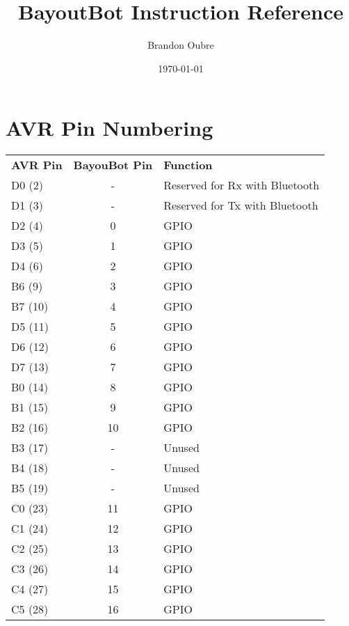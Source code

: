 \documentclass[letterpaper,titlepage]{article}
\begin{document}
	\title{BayoutBot Instruction Reference}
	\author{Brandon Oubre}
	\date{\today}
	\maketitle
	
	\newcommand{\instrDesc}[2]{
		\textbf{#1} \\
		#2 \\
	}

	\section*{AVR Pin Numbering}
	\begin{tabular}{l | c | l}
	\textbf{AVR Pin} & \textbf{BayouBot Pin} & \textbf{Function} \\
	D0 (2) & - & Reserved for Rx with Bluetooth \\
	D1 (3) & - & Reserved for Tx with Bluetooth \\
	D2 (4) & 0 & GPIO \\
	D3 (5) & 1 & GPIO \\
	D4 (6) & 2 & GPIO \\
	B6 (9) & 3 & GPIO \\
	B7 (10) & 4 & GPIO \\
	D5 (11) & 5 & GPIO \\
	D6 (12) & 6 & GPIO \\
	D7 (13) & 7 & GPIO \\
	B0 (14) & 8 & GPIO \\
	B1 (15) & 9 & GPIO \\
	B2 (16) & 10 & GPIO \\
	B3 (17) & - & Unused \\
	B4 (18) & - & Unused \\
	B5 (19) & - & Unused \\
	C0 (23) & 11 & GPIO \\
	C1 (24) & 12 & GPIO \\
	C2 (25) & 13 & GPIO \\
	C3 (26) & 14 & GPIO \\
	C4 (27) & 15 & GPIO \\
	C5 (28) & 16 & GPIO \\
	\end{tabular}
	\clearpage
\end{document}
